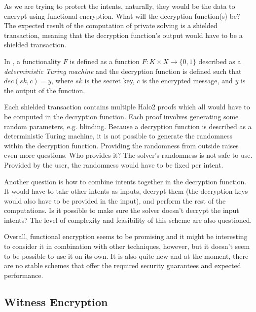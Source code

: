 \documentclass[final]{msc}
\begin{document}
As we are trying to protect the intents, naturally, they would be the data to encrypt using functional encryption. What will the decryption function(s) be? The expected result of the computation of private solving is a shielded transaction, meaning that the decryption function's output would have to be a shielded transaction.

\hfill

In \cite{fe}, a functionality $F$ is defined as a function $F: K \times X \rightarrow \{0, 1\}$ described as a \textit{deterministic Turing machine} and the decryption function is defined such that $dec(sk, c) = y$, where $sk$ is the secret key, $c$ is the encrypted message, and $y$ is the output of the function.

Each shielded transaction contains multiple Halo2 proofs which all would have to be computed in the decryption function. Each proof involves generating some random parameters, e.g. blinding. Because a decryption function is described as a deterministic Turing machine, it is not possible to generate the randomness within the decryption function. Providing the randomness from outside raises even more questions. Who provides it? The solver's randomness is not safe to use. Provided by the user, the randomness would have to be fixed per intent.

\hfill

Another question is how to combine intents together in the decryption function. It would have to take other intents as inputs, decrypt them (the decryption keys would also have to be provided in the input), and perform the rest of the computations. Is it possible to make sure the solver doesn't decrypt the input intents? The level of complexity and feasibility of this scheme are also questioned.

\hfill

Overall, functional encryption seems to be promising and it might be interesting to consider it in combination with other techniques, however, but it doesn't seem to be possible to use it on its own. It is also quite new and at the moment, there are no stable schemes that offer the required security guarantees and expected performance.


\subsection{Witness Encryption}
\end{document}
